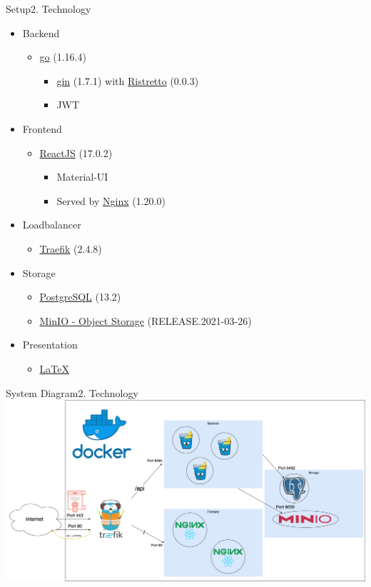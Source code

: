 \documentclass[aspectratio=169,20pt]{beamer}
\begin{document}
\begin{frame}{Setup}{2. Technology}
	\begin{itemize}
		\item{Backend}
		\begin{itemize}
			\item{\href{https://golang.org/}{go} (1.16.4)}
			\begin{itemize}
				\item{\href{https://gin-gonic.com/}{gin} (1.7.1) with \href{https://github.com/dgraph-io/ristretto}{Ristretto} (0.0.3)}
				\item{JWT}
			\end{itemize}
		\end{itemize}
		\item{Frontend}
		\begin{itemize}
			\item{\href{https://reactjs.org/versions/}{ReactJS} (17.0.2)}
			\begin{itemize}
				\item{Material-UI}
				\item{Served by \href{https://nginx.org/}{Nginx} (1.20.0)}
			\end{itemize}
		\end{itemize}
		\item{Loadbalancer}
		\begin{itemize}
			\item{\href{https://traefik.io/}{Traefik} (2.4.8)}
		\end{itemize} 
		\item{Storage}
		\begin{itemize}
			\item{\href{https://www.postgresql.org/}{PostgreSQL} (13.2)}
			\item{\href{https://min.io/}{MinIO - Object Storage} (RELEASE.2021-03-26)}
		\end{itemize}
		\item{Presentation}
		\begin{itemize}
			\item{\href{https://github.com/ost-fh/Latex-Beamer-Theme}{LaTeX}}
		\end{itemize}       
	\end{itemize}
\end{frame}

\begin{frame}{System Diagram}{2. Technology}
	\includegraphics[scale=0.45]{Infrastruktur}	
\end{frame}
\end{document}
